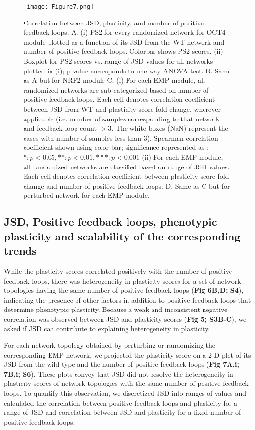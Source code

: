 \documentclass[preprint,review,12pt]{elsarticle}
\begin{document}
	\begin{figure}[!ht]
		\centering
		\texttt{[image: Figure7.png]}
		\caption{Correlation between JSD, plasticity, and number of positive feedback loops.
			A.	(i) PS2 for every randomized network for OCT4 module plotted as a function of its JSD from the WT network and number of positive feedback loops. Colorbar shows PS2 scores. (ii) Boxplot for PS2 scores vs. range of JSD values for all networks plotted in (i); p-value corresponds to one-way ANOVA test.
			B.	Same as A but for NRF2 module
			C.	(i) For each EMP module, all randomized networks are sub-categorized based on number of positive feedback loops. Each cell denotes correlation coefficient between JSD from WT and plasticity score fold change, wherever applicable (i.e. number of samples corresponding to that network and feedback loop count $>3$. The white boxes (NaN) represent the cases with number of samples less than 3). Spearman correlation coefficient shown using color bar; significance represented as : $*: p<0.05, **: p<0.01, ***: p<0.001$  (ii) For each EMP module, all randomized networks are classified based on range of JSD values. Each cell denotes correlation coefficient between plasticity score fold change and number of positive feedback loops.
			D.	Same as C but for perturbed network for each EMP module.
			}
		\label{figure7}
	\end{figure}

\subsection{\color{red}JSD, Positive feedback loops, phenotypic plasticity and scalability of the corresponding trends\color{black}}
	\color{red}While the plasticity scores correlated positively with the number of positive feedback loops, there was heterogeneity in plasticity scores for a set of network topologies having the same number of positive feedback loops (\textbf{Fig 6B,D; S4}), indicating the presence of other factors in addition to positive feedback loops that determine phenotypic plasticity. Because a weak and inconsistent negative correlation was observed between JSD and plasticity scores (\textbf{Fig 5; S3B-C}), we asked if JSD can contribute to explaining heterogeneity in plasticity. 
	
	
	For each network topology obtained by perturbing or randomizing the corresponding EMP network, we projected the plasticity score on a 2-D plot of its JSD from the wild-type and the number of positive feedback loops (\textbf{Fig 7A,i; 7B,i; S6}). These plots convey that JSD did not resolve the heterogeneity in plasticity scores of network topologies with the same number of positive feedback loops. To quantify this observation, we discretized JSD into ranges of values and calculated the correlation between positive feedback loops and plasticity for a range of JSD and correlation between JSD and plasticity for a fixed number of positive feedback loops. 
	
\end{document}
